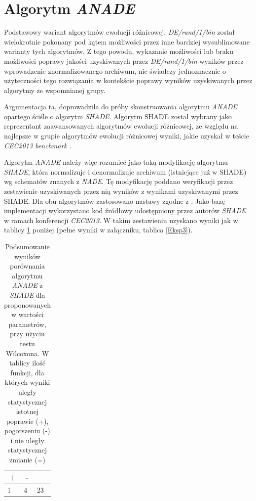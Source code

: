 \documentclass[12pt,a4paper]{report}
\begin{document}
{{{{{{\section{Algorytm \emph{ANADE}}
\label{ANADE}
\par{
Podstawowy wariant algorytmów ewolucji różnicowej, \emph{DE/rand/1/bin} został wielokrotnie pokonany pod kątem możliwości przez inne bardziej wysublimowane warianty tych algorytmów. Z tego powodu, wykazanie możliwości lub braku możliwości poprawy jakości uzyskiwanych przez \emph{DE/rand/1/bin} wyników przez wprowadzenie znormalizowanego archiwum, nie świadczy jednoznacznie o użyteczności tego rozwiązania w kontekście poprawy wyników uzyskiwanych przez algorytmy ze wspomnianej grupy.
}
\par{
Argumentacja ta, doprowadziła do próby skonstruowania algorytmu \emph{ANADE} opartego ściśle o algorytm \emph{SHADE}. Algorytm SHADE został wybrany jako reprezentant zaawansowanych algorytmów ewolucji różnicowej, ze względu na najlepsze w grupie algorytmów ewolucji różnicowej wyniki, jakie uzyskał w teście \emph{CEC2013 benchmark} \cite{CEC2013Comp}.
}
\par{
Algorytm \emph{ANADE} należy więc rozumieć jako taką modyfikację algorytmu \emph{SHADE}, która normalizuje i denormalizuje archiwum (istniejące już w SHADE) wg schematów znanych z \emph{NADE}. Tę modyfikację poddano weryfikacji przez zestawienie uzyskiwanych przez nią wyników z wynikami uzyskiwanymi przez SHADE. Dla obu algorytmów zastosowano nastawy zgodne z \cite{SHADE}. Jako bazę implementacji wykorzystano kod źródłowy udostępniony przez autorów \emph{SHADE} w ramach konferencji \emph{CEC2013}. W takim zestawieniu uzyskano wyniki jak w tablicy \ref{Eksp3short} poniżej (pełne wyniki w załączniku, tablica \ref{Eksp3}).
}

\begin{table}[h]
\centering
\caption{Podsumowanie wyników porównania algorytmu \emph{ANADE} z \emph{SHADE} dla proponowanych w \cite{SHADE} wartości parametrów, przy użyciu testu Wilcoxona. W tablicy ilość funkcji, dla których wyniki uległy statystycznej istotnej poprawie (+), pogorszeniu (-) i nie uległy statystycznej zmianie (=)}
\label{Eksp3short}
\begin{tabular}{|l|l|l|}
\hline
\multicolumn{1}{|c|}{{\bf +}} & \multicolumn{1}{c|}{{\bf -}} & \multicolumn{1}{c|}{{\bf =}} \\ \hline
1       & 4       & 23      \\ \hline
\end{tabular}
\end{table}

}}}}}}
\end{document}
